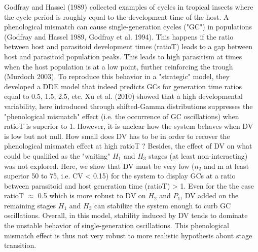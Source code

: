 \documentclass[12pt,a4paper,onecolumn]{article}
\begin{document}
\tabto{1.5 cm} Godfray and Hassel (1989) collected examples of cycles in tropical insects where the cycle period is roughly equal to the development time of the host. A phenological mismatch can cause single-generation cycles ("GC") in populations (Godfray and Hassel 1989, Godfray et al. 1994). This happens if the ratio between host and parasitoid development times (ratioT) leads to a gap between host and parasitoid population peaks. This leads to high parasitism at times when the host population is at a low point, further reinforcing the trough (Murdoch 2003).  To reproduce this behavior in a "strategic" model, they developed a DDE model that indeed predicts GCs for generation time ratios equal to 0.5, 1.5, 2.5, etc. Xu et al. (2010) showed that a high developmental variability, here introduced through shifted-Gamma distributions suppresses the "phenological mismatch" effect (i.e. the occurrence of GC oscillations) when ratioT is superior to 1. However, it is unclear how the system behaves when DV is low but not null. How small does DV has to be in order to recover the phenological mismatch effect at high ratioT ? Besides, the effect of DV on what could be qualified as the "waiting" $H_1$ and $H_3$ stages (at least non-interacting) was not explored. Here, we show that DV must be very low ($n_2$ and m at least superior 50 to 75, i.e. CV < 0.15) for the system to display GCs at a ratio between parasitoid and host generation time (ratioT) > 1. Even for the the case ratioT $\approx$ 0.5 which is more robust to DV on $H_2$ and $P_1$, DV added on the remaining stages $H_1$ and $H_3$ can stabilize the system enough to curb GC oscillations. Overall, in this model, stability induced by DV tends to dominate the unstable behavior of single-generation oscillations. This phenological mismatch effect is thus not very robust to more realistic hypothesis about stage transition.
\end{document}
